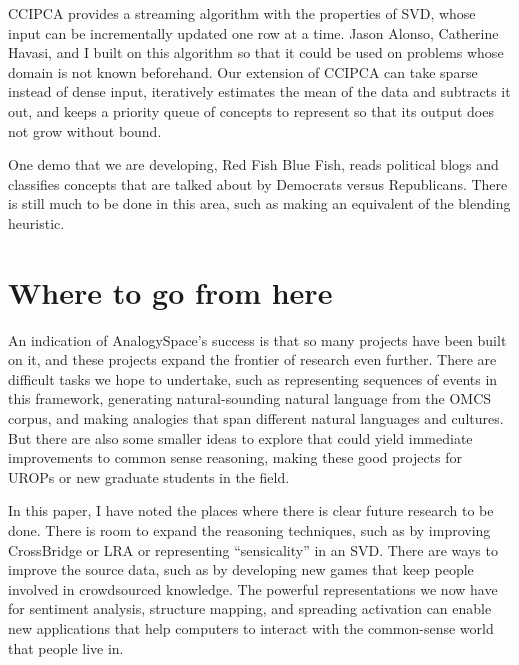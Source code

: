 \documentclass[11pt]{article}
\begin{document}
CCIPCA \cite{ccipca} provides a streaming algorithm with the properties of SVD, whose input can be incrementally updated one row at a time. Jason Alonso, Catherine Havasi, and I built on this algorithm so that it could be used on problems whose domain is not known beforehand. Our extension of CCIPCA can take sparse instead of dense input, iteratively estimates the mean of the data and subtracts it out, and keeps a priority queue of concepts to represent so that its output does not grow without bound.

One demo that we are developing, Red Fish Blue Fish, reads political blogs and classifies concepts that are talked about by Democrats versus Republicans. There is still much to be done in this area, such as making an equivalent of the blending heuristic.

\section{Where to go from here}

An indication of AnalogySpace's success is that so many projects have been built on it, and these projects expand the frontier of research even further. There are difficult tasks we hope to undertake, such as representing sequences of events in this framework, generating natural-sounding natural language from the OMCS corpus, and making analogies that span different natural languages and cultures. But there are also some smaller ideas to explore that could yield immediate improvements to common sense reasoning, making these good projects for UROPs or new graduate students in the field.

In this paper, I have noted the places where there is clear future research to be done. There is room to expand the reasoning techniques, such as by improving CrossBridge or LRA or representing ``sensicality'' in an SVD. There are ways to improve the source data, such as by developing new games that keep people involved in crowdsourced knowledge. The powerful representations we now have for sentiment analysis, structure mapping, and spreading activation can enable new applications that help computers to interact with the common-sense world that people live in.


\begin{small}

\end{small}
\end{document}
